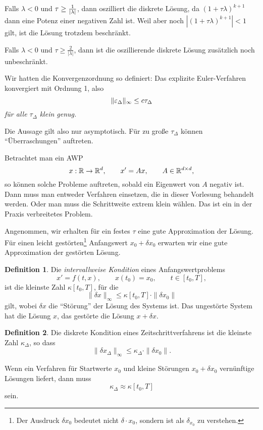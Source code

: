 \documentclass[
 a4paper,
 12pt,
 parskip=half
 ]{scrreprt}
\theoremstyle{plain}
\theoremstyle{definition}
\numberwithin{rmrk}{chapter}
\numberwithin{defn}{chapter}
\numberwithin{exmp}{chapter}
\numberwithin{prgp}{subsection}
\newtheorem*{defn*}{Definition}
\numberwithin{equation}{chapter}
\begin{document}
Falls $\lambda < 0$ und $\tau \ge \frac{1}{|\lambda|}$, dann oszilliert die diskrete
Lösung, da $(1+ \tau \lambda)^{k+1}$ dann eine Potenz einer negativen Zahl ist.
Weil aber noch $|(1+ \tau \lambda)^{k+1}| < 1$ gilt, ist die Lösung trotzdem
beschränkt.

Falls $\lambda < 0$ und $\tau \ge \frac{2}{|\lambda|}$, dann ist die
oszillierende diskrete Lösung zusätzlich noch unbeschränkt.

Wir hatten die Konvergenzordnung so definiert: Das explizite Euler-Verfahren
konvergiert mit Ordnung 1, also
\[ \| \varepsilon_\Delta \|_\infty \le c \tau_\Delta \]
\emph{für alle $\tau_\Delta$ klein genug.}

Die Aussage gilt also nur asymptotisch. Für zu große $\tau_\Delta$ können
``Überraschungen'' auftreten.

Betrachtet man ein AWP
\[ x: \mathbb{R} \to \mathbb{R}^d, \qquad
  x' = Ax, \qquad
  A \in \mathbb{R}^{d \times d}, \]
so können solche Probleme auftreten, sobald ein Eigenwert von $A$ negativ ist.
Dann muss man entweder Verfahren einsetzen, die in dieser Vorlesung behandelt
werden. Oder man muss die Schrittweite extrem klein wählen. Das ist ein in der
Praxis verbreitetes Problem.

Angenommen, wir erhalten für ein festes $\tau$ eine gute Approximation der
Lösung. Für einen leicht gestörten\footnote{%
  Der Ausdruck $\delta x_0$ bedeutet nicht $\delta \cdot x_0$, sondern ist als
  $\delta_{x_0}$ zu verstehen.
} Anfangswert $x_0 + \delta x_0$ erwarten wir eine gute Approximation der
gestörten Lösung. 

\begin{defn*}
  Die \emph{intervallweise Kondition} eines Anfangswertproblems
  \[ x' = f(t,x), \qquad x(t_0) = x_0, \qquad t \in [t_0, T], \]
  ist die kleinste Zahl $\kappa[t_0, T]$, für die
  \[ \| \delta x \|_\infty \le \kappa[t_0, T] \cdot \| \delta x_0 \| \]
  gilt, wobei $\delta x$ die ``Störung'' der Lösung des Systems ist. Das
  ungestörte System hat die Lösung $x$, das gestörte die Lösung $x + \delta x$.
\end{defn*}

\begin{defn*}
  Die diskrete Kondition eines Zeitschrittverfahrens ist die kleinste Zahl
  $\kappa_\Delta$, so dass
  \[ \| \delta x_\Delta \|_\infty \le \kappa_\Delta \cdot \| \delta x_0 \|. \]
\end{defn*}

Wenn ein Verfahren für Startwerte $x_0$ und kleine Störungen $x_0 + \delta x_0$
vernünftige Lösungen liefert, dann muss
\[ \kappa_\Delta \approx \kappa[t_0,T] \]
sein.
\end{document}
